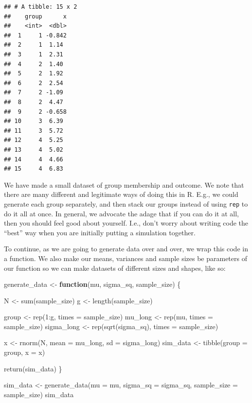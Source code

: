 \documentclass[
]{book}
\newenvironment{Shaded}{\begin{snugshade}}{\end{snugshade}}
\newcommand{\AttributeTok}[1]{\textcolor[rgb]{0.77,0.63,0.00}{#1}}
\newcommand{\ControlFlowTok}[1]{\textcolor[rgb]{0.13,0.29,0.53}{\textbf{#1}}}
\newcommand{\DecValTok}[1]{\textcolor[rgb]{0.00,0.00,0.81}{#1}}
\newcommand{\FunctionTok}[1]{\textcolor[rgb]{0.00,0.00,0.00}{#1}}
\newcommand{\NormalTok}[1]{#1}
\newcommand{\OtherTok}[1]{\textcolor[rgb]{0.56,0.35,0.01}{#1}}
\newcommand{\SpecialCharTok}[1]{\textcolor[rgb]{0.00,0.00,0.00}{#1}}
\begin{document}
\begin{verbatim}
## # A tibble: 15 x 2
##    group      x
##    <int>  <dbl>
##  1     1 -0.842
##  2     1  1.14 
##  3     1  2.31 
##  4     2  1.40 
##  5     2  1.92 
##  6     2  2.54 
##  7     2 -1.09 
##  8     2  4.47 
##  9     2 -0.658
## 10     3  6.39 
## 11     3  5.72 
## 12     4  5.25 
## 13     4  5.02 
## 14     4  4.66 
## 15     4  6.83
\end{verbatim}

We have made a small dataset of group membership and outcome.
We note that there are many different and legitimate ways of doing this in R.
E.g., we could generate each group separately, and then stack our groups instead of using \texttt{rep} to do it all at once.
In general, we advocate the adage that if you can do it at all, then you should feel good about yourself.
I.e., don't worry about writing code the ``best'' way when you are initially putting a simulation together.

To continue, as we are going to generate data over and over, we wrap this code in a function.
We also make our means, variances and sample sizes be parameters of our function so we can make datasets of different sizes and shapes, like so:

\begin{Shaded}
\begin{Highlighting}[]
\NormalTok{generate\_data }\OtherTok{\textless{}{-}} \ControlFlowTok{function}\NormalTok{(mu, sigma\_sq, sample\_size) \{}

\NormalTok{  N }\OtherTok{\textless{}{-}} \FunctionTok{sum}\NormalTok{(sample\_size)}
\NormalTok{  g }\OtherTok{\textless{}{-}} \FunctionTok{length}\NormalTok{(sample\_size)}

\NormalTok{  group }\OtherTok{\textless{}{-}} \FunctionTok{rep}\NormalTok{(}\DecValTok{1}\SpecialCharTok{:}\NormalTok{g, }\AttributeTok{times =}\NormalTok{ sample\_size)}
\NormalTok{  mu\_long }\OtherTok{\textless{}{-}} \FunctionTok{rep}\NormalTok{(mu, }\AttributeTok{times =}\NormalTok{ sample\_size)}
\NormalTok{  sigma\_long }\OtherTok{\textless{}{-}} \FunctionTok{rep}\NormalTok{(}\FunctionTok{sqrt}\NormalTok{(sigma\_sq), }\AttributeTok{times =}\NormalTok{ sample\_size)}

\NormalTok{  x }\OtherTok{\textless{}{-}} \FunctionTok{rnorm}\NormalTok{(N, }\AttributeTok{mean =}\NormalTok{ mu\_long, }\AttributeTok{sd =}\NormalTok{ sigma\_long)}
\NormalTok{  sim\_data }\OtherTok{\textless{}{-}} \FunctionTok{tibble}\NormalTok{(}\AttributeTok{group =}\NormalTok{ group, }\AttributeTok{x =}\NormalTok{ x)}

  \FunctionTok{return}\NormalTok{(sim\_data)}
\NormalTok{\}}

\NormalTok{sim\_data }\OtherTok{\textless{}{-}} \FunctionTok{generate\_data}\NormalTok{(}\AttributeTok{mu =}\NormalTok{ mu, }\AttributeTok{sigma\_sq =}\NormalTok{ sigma\_sq, }
                          \AttributeTok{sample\_size =}\NormalTok{ sample\_size)}
\NormalTok{sim\_data}
\end{Highlighting}
\end{Shaded}
\end{document}
